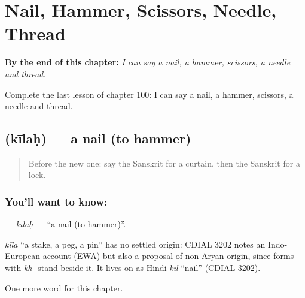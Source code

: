 
\chapter{Nail, Hammer, Scissors, Needle, Thread}
\label{ch:sa-nail-hammer-scissors-needle-thread}

\begin{chapteropening}
\textbf{By the end of this chapter:} \emph{I can say a nail, a hammer, scissors, a needle and thread.}

Complete the last lesson of chapter 100: I can say a nail, a hammer, scissors, a needle and thread.
\end{chapteropening}

\section[\texorpdfstring{\sk{कीलः} (kīlaḥ)}{कीलः (kīlaḥ)}]{ (kīlaḥ) — a nail (to hammer)}

\label{lesson:SA-C100-kilah}



\begin{quote}
Before the new one: say the Sanskrit for a curtain, then the Sanskrit for a lock.
\end{quote}

\subsection*{You'll want to know: }
\textbf{} — \emph{kīlaḥ} — \textquotedblleft{}a nail (to hammer)\textquotedblright{}.

\begin{cousinweb}
\emph{kīla} \textquotedblleft{}a stake, a peg, a pin\textquotedblright{} has no settled origin: CDIAL 3202 notes an Indo-European account (EWA) but also a proposal of non-Aryan origin, since forms with \emph{kh-} stand beside it. It lives on as Hindi \emph{kīl} \textquotedblleft{}nail\textquotedblright{} (CDIAL 3202).
\end{cousinweb}

\begin{grammarlens}[title={What you've built}]
One more word for this chapter.
\end{grammarlens}

